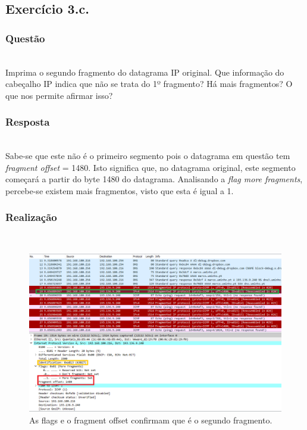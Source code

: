 \documentclass{llncs}
\begin{document}
\subsection{Exercício 3.c.}
\subsubsection{Questão}\rule[-10pt]{0pt}{10pt}\\

Imprima o segundo fragmento do datagrama IP original. Que informação do cabeçalho IP indica que não se trata do 1º fragmento? Há mais fragmentos? O que nos permite afirmar isso?

\subsubsection{Resposta}\rule[-10pt]{0pt}{10pt}\\

Sabe-se que este não é o primeiro segmento pois o datagrama em questão tem \textit{fragment offset} = 1480. Isto significa que, no datagrama original, este segmento começará a partir do byte 1480 do datagrama. Analisando a \textit{flag more fragments}, percebe-se existem mais fragmentos, visto que esta é igual a 1.

\subsubsection{Realização}\rule[-10pt]{0pt}{10pt}\\

\begin{figure}
	\begin{center}
	\includegraphics[scale=0.35]{./imagens/packet_second.png} 
	\end{center}
	\caption{\label{fig:packet_second}As flags e o fragment offset confirmam que é o segundo fragmento.}
\end{figure} 
\end{document}
